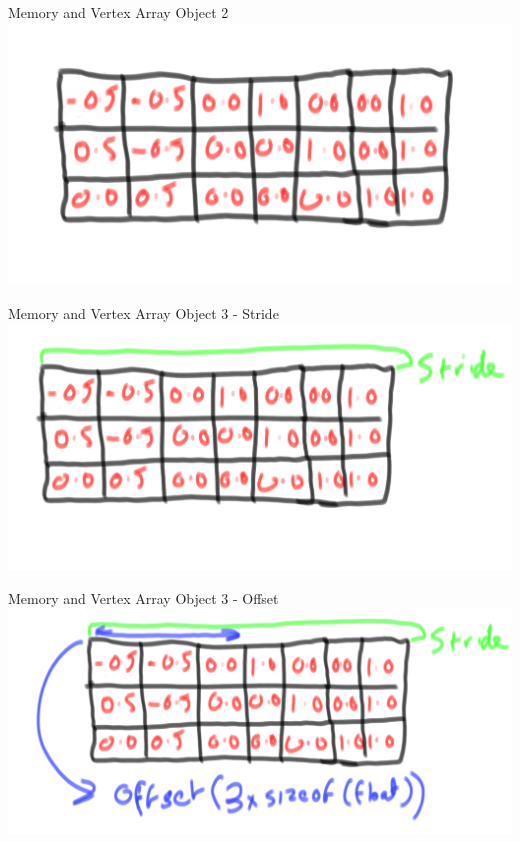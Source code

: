 \begin{frame}{Memory and Vertex Array Object 2}
	\includegraphics[height=0.8\textheight]{MemoryLayoutValues}	
\end{frame}

\begin{frame}{Memory and Vertex Array Object 3 - Stride}
	\includegraphics[height=0.8\textheight]{MemoryLayoutStride}	
\end{frame}

\begin{frame}{Memory and Vertex Array Object 3 - Offset}
	\includegraphics[height=0.8\textheight]{MemoryLayoutOffset}	
\end{frame}